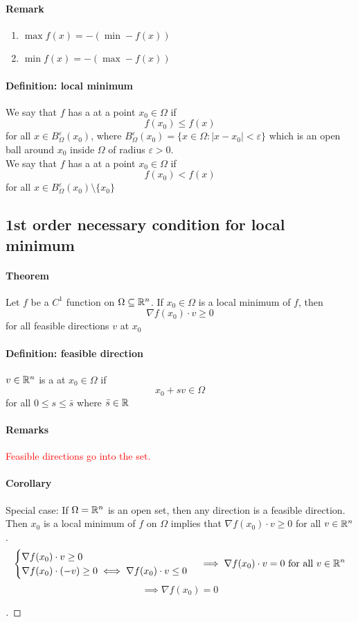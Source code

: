 \documentclass[11pt]{article}
\begin{document}
\paragraph{Remark}
\begin{enumerate}
	\item $\max f(x) = - (\min - f(x))$
	\item $\min f(x) = - (\max - f(x))$
\end{enumerate}

\paragraph{Definition: local minimum}
We say that $f$ has a  at a point $x_0 \in \Omega$ if
$$f(x_0) \leq f(x)$$ for all $x \in B_{\Omega}^\varepsilon (x_0)$, where $B_{\Omega}^\varepsilon (x_0) = \{ x \in \Omega: |x - x_0| < \varepsilon\}$ which is an open ball around $x_0$ inside $\Omega$ of radius $\varepsilon >0$. \\
We say that $f$ has a  at a point $x_0 \in \Omega$ if
$$f(x_0) < f(x)$$ for all $x \in B_{\Omega}^\varepsilon (x_0) \setminus \{x_0\}$

\subsection{1st order necessary condition for local minimum}
\paragraph{Theorem} Let $f$ be a $C^1$ function on $\Omega \subseteq \mathbb{R}^n$. If $x_0 \in \Omega$ is a local minimum of $f$, then
$$ \nabla f(x_0) \cdot v \geq 0$$
for all feasible directions $v$ at $x_0$

\paragraph{Definition: feasible direction}
$v \in \mathbb{R}^n$ is a  at $x_0 \in \Omega$ if $$x_0 + sv \in \Omega$$ for all $0 \leq s \leq \bar{s}$ where $\bar{s} \in \mathbb{R}$
\paragraph{Remarks}
\textcolor{red}{Feasible directions go into the set.}
\paragraph{Corollary}
Special case: If $\Omega = \mathbb{R}^n$ is an open set, then any direction is a feasible direction.
Then $x_0$ is a local minimum of $f$ on $\Omega$ implies that $\nabla f(x_0) \cdot v \geq 0$ for all $v \in \mathbb{R}^n$.
$$\begin{cases}
	\nabla f(x_0) \cdot v \geq 0 \\
	\nabla f(x_0) \cdot (-v) \geq 0 \iff \nabla f(x_0) \cdot v \leq 0
\end{cases} \implies \nabla f(x_0) \cdot v = 0 \text{ for all $v \in \mathbb{R}^n$}$$
$$\implies \nabla f(x_0) = 0$$
\begin{proof}
[ ]
\end{proof}
\end{document}
